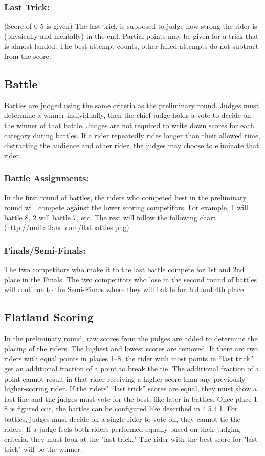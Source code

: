 \subsubsection{Last Trick:}
(Score of 0-5 is given) The last trick is supposed to judge how strong the rider is (physically and mentally) in the end. Partial points may be given for a trick that is almost landed. The best attempt counts, other failed attempts do not subtract from the score.
\subsection{Battle}
Battles are judged using the same criteria as the preliminary round. Judges must determine a winner individually, then the chief judge holds a vote to decide on the winner of that battle. Judges are not required to write down scores for each category during battles. If a rider repeatedly rides longer than their allowed time, distracting the audience and other rider, the judges may choose to eliminate that rider.
\subsubsection{Battle Assignments:}
In the first round of battles, the riders who competed best in the preliminary round will compete against the lower scoring competitors. For example, 1 will battle 8, 2 will battle 7, etc. The rest will follow the following chart. (http://uniflatland.com/flatbattles.png)
\subsubsection{Finals/Semi-Finals:}
The two competitors who make it to the last battle compete for 1st and 2nd place in the Finals. The two competitors who lose in the
second round of battles will continue to the Semi-Finals where they will battle for 3rd and 4th place.
\subsection{Flatland Scoring}
In the preliminary round, raw scores from the judges are added to determine the placing of the riders. The highest and lowest scores are removed. If there are two riders with equal points in places 1–8, the rider with most points in “last trick” get an additional fraction of a point to break the tie. The additional fraction of a point cannot result in that rider receiving a higher score than any previously higher-scoring rider. If the riders' “last trick” scores are equal, they must show a last line and the judges must vote for the best, like later in battles. Once place 1–8 is figured out, the battles can be configured like described in 4.5.4.1. For battles, judges must decide on a single rider to vote on, they cannot tie the riders. If a judge feels both riders
performed equally based on their judging criteria, they must look at the "last trick." The rider with the best score for "last trick" will be the winner. 
